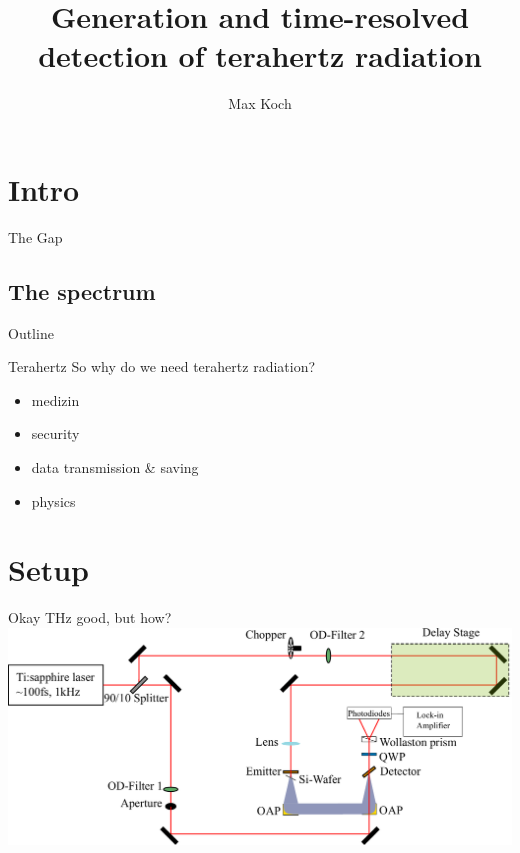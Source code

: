 \documentclass[aspectratio=1610, 9pt]{beamer}
\title{Generation and time-resolved detection of
terahertz radiation}
\author[M.~Koch]{Max Koch}
\institute[AG Wang]{Arbeitsgruppe Wang \\  Fakultät Physik}
\begin{document}
\maketitle

\section{Intro}

\begin{frame}{The Gap}
  \subsection{The spectrum}
\end{frame}

\begin{frame}{Outline}
  \tableofcontents
\end{frame}

\begin{frame}{Terahertz}
  So why do we need terahertz radiation?
  \begin{itemize}
    \item medizin
    \item security
    \item data transmission \& saving
    \item physics
  \end{itemize}
\end{frame}

\section{Setup}

\begin{frame}{Okay THz good, but how?}
  \includegraphics[width=\textwidth]{images/Aufbau.pdf}
\end{frame}
\end{document}
